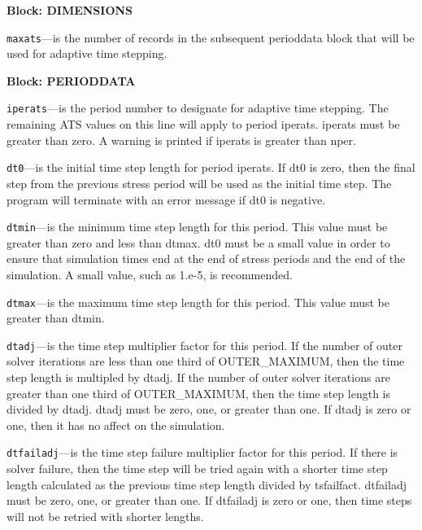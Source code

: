 
\item \textbf{Block: DIMENSIONS}

\begin{description}
\item \texttt{maxats}---is the number of records in the subsequent perioddata block that will be used for adaptive time stepping.

\end{description}
\item \textbf{Block: PERIODDATA}

\begin{description}
\item \texttt{iperats}---is the period number to designate for adaptive time stepping.  The remaining ATS values on this line will apply to period iperats.  iperats must be greater than zero.  A warning is printed if iperats is greater than nper.

\item \texttt{dt0}---is the initial time step length for period iperats.  If dt0 is zero, then the final step from the previous stress period will be used as the initial time step.  The program will terminate with an error message if dt0 is negative.

\item \texttt{dtmin}---is the minimum time step length for this period.  This value must be greater than zero and less than dtmax.  dt0 must be a small value in order to ensure that simulation times end at the end of stress periods and the end of the simulation.  A small value, such as 1.e-5, is recommended.

\item \texttt{dtmax}---is the maximum time step length for this period.  This value must be greater than dtmin.

\item \texttt{dtadj}---is the time step multiplier factor for this period.  If the number of outer solver iterations are less than one third of OUTER\_MAXIMUM, then the time step length is multipled by dtadj.  If the number of outer solver iterations are greater than one third of OUTER\_MAXIMUM, then the time step length is divided by dtadj.  dtadj must be zero, one, or greater than one.  If dtadj is zero or one, then it has no affect on the simulation.

\item \texttt{dtfailadj}---is the time step failure multiplier factor for this period.  If there is solver failure, then the time step will be tried again with a shorter time step length calculated as the previous time step length divided by tsfailfact.  dtfailadj must be zero, one, or greater than one.  If dtfailadj is zero or one, then time steps will not be retried with shorter lengths.

\end{description}

